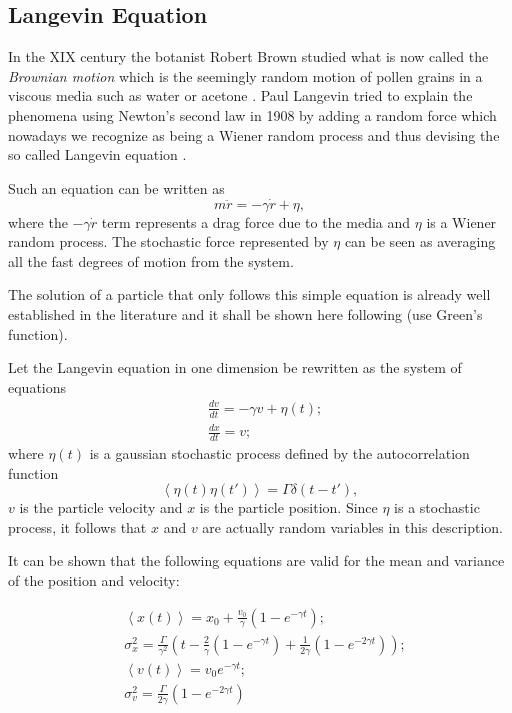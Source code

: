 \subsection{Langevin Equation}

In the XIX century the botanist Robert Brown studied what is now called the \textit{Brownian motion} which is the seemingly random motion of pollen grains in a viscous media such as water or acetone \cite{nelsonDynamicalTheories2001}. Paul Langevin tried to explain the phenomena using Newton's second law in 1908 by adding a random force which nowadays we recognize as being a Wiener random process and thus devising the so called Langevin equation \cite{lemonsPaulLangevin1997}.

Such an equation can be written as
\[ m\ddot{r} = -\gamma \dot{r} + \eta,\]
where the $ -\gamma \dot{r} $ term represents a drag force due to the media and $ \eta $ is a Wiener random process. The stochastic force represented by $ \eta $ can be seen as averaging all the fast degrees of motion from the system.

The solution of a particle that only follows this simple equation is already well established in the literature and it shall be shown here following \cite{tomeDinamicaEstocastica2014} (use Green's function). 

Let the Langevin equation in one dimension be rewritten as the system of equations
\begin{equation}
		\begin{aligned}
		&\frac{dv}{dt} = -\gamma v + \eta\left(t\right); \\
		&\frac{dx}{dt} = v;
		\end{aligned}
\end{equation}
where $\eta\left(t\right)$ is a gaussian stochastic process defined by the autocorrelation function
$$ \left< \eta\left(t\right) \eta\left(t'\right)\right> = \Gamma \delta\left(t - t'\right), $$ 
$ v $ is the particle velocity and $ x $ is the particle position. Since $ \eta $ is a stochastic process, it follows that $ x $ and $ v $ are actually random variables in this description.

It can be shown that the following equations are valid for the mean and variance of the position and velocity:

\begin{equation}
\begin{aligned}
	&\left<x(t)\right> = x_{0} + \frac{v_{0}}{\gamma}\left(1 - e^{-\gamma t}\right); \\
	&\sigma_{x}^{2} = \frac{\Gamma}{\gamma^{2}} \left(t - \frac{2}{\gamma}(1-e^{-\gamma t}) + \frac{1}{2\gamma}\left(1-e^{-2\gamma t}\right) \right); \\
	&\left<v(t)\right> = v_{0} e^{-\gamma t}; \\
	&\sigma_{v}^{2} = \frac{\Gamma}{2\gamma} \left(1 - e^{-2\gamma t}\right)
\end{aligned}
\end{equation}

